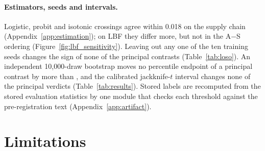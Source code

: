 

\paragraph{Estimators, seeds and intervals.}
Logistic, probit and isotonic crossings agree within 0.018 on the supply chain
(Appendix~\ref{app:estimation}); on LBF they differ more, but not in the A$-$S ordering
(Figure~\ref{fig:lbf_sensitivity}). Leaving out any one of the ten training seeds changes the sign of none of
the principal contrasts (Table~\ref{tab:loso}). An independent 10,000-draw bootstrap moves no
percentile endpoint of a principal contrast by more than \VrvMCShift{}, and the calibrated jackknife-$t$ interval changes none of the
\VrvNContrasts{} principal verdicts (Table~\ref{tab:results}). Stored labels are recomputed from the stored
evaluation statistics by one module that checks each threshold against the pre-registration text
(Appendix~\ref{app:artifact}).


\section{Limitations}
\label{sec:limitations}

